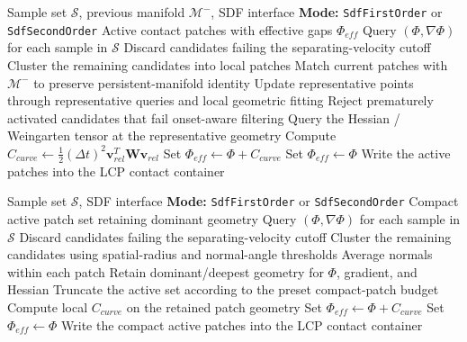 \begin{algorithm}[htbp]
\caption{\texttt{SlidingPatch} pipeline for smooth continuous contact}
\label{alg:slidingpatch}
\begin{algorithmic}[1]
\Require Sample set $\mathcal{S}$, previous manifold $\mathcal{M}^{-}$, SDF interface
\Statex \textbf{Mode:} \texttt{SdfFirstOrder} or \texttt{SdfSecondOrder}
\Ensure Active contact patches with effective gaps $\Phi_{eff}$
\State Query $(\Phi,\nabla \Phi)$ for each sample in $\mathcal{S}$
\State Discard candidates failing the separating-velocity cutoff
\State Cluster the remaining candidates into local patches
\State Match current patches with $\mathcal{M}^{-}$ to preserve persistent-manifold identity
\State Update representative points through representative queries and local geometric fitting
\State Reject prematurely activated candidates that fail onset-aware filtering
    \State Query the Hessian / Weingarten tensor at the representative geometry
    \State Compute $C_{curve} \gets \frac{1}{2}(\Delta t)^2 \mathbf{v}_{rel}^{T}\mathbf{W}\mathbf{v}_{rel}$
    \State Set $\Phi_{eff} \gets \Phi + C_{curve}$
\Else
    \State Set $\Phi_{eff} \gets \Phi$
\EndIf
\State Write the active patches into the LCP contact container
\end{algorithmic}
\end{algorithm}

\begin{algorithm}[htbp]
\caption{\texttt{CompactDiscrete} pipeline for compact or singular contact}
\label{alg:compactdiscrete}
\begin{algorithmic}[1]
\Require Sample set $\mathcal{S}$, SDF interface
\Statex \textbf{Mode:} \texttt{SdfFirstOrder} or \texttt{SdfSecondOrder}
\Ensure Compact active patch set retaining dominant geometry
\State Query $(\Phi,\nabla \Phi)$ for each sample in $\mathcal{S}$
\State Discard candidates failing the separating-velocity cutoff
\State Cluster the remaining candidates using spatial-radius and normal-angle thresholds
\State Average normals within each patch
\State Retain dominant/deepest geometry for $\Phi$, gradient, and Hessian
\State Truncate the active set according to the preset compact-patch budget
    \State Compute local $C_{curve}$ on the retained patch geometry
    \State Set $\Phi_{eff} \gets \Phi + C_{curve}$
\Else
    \State Set $\Phi_{eff} \gets \Phi$
\EndIf
\State Write the compact active patches into the LCP contact container
\end{algorithmic}
\end{algorithm}
